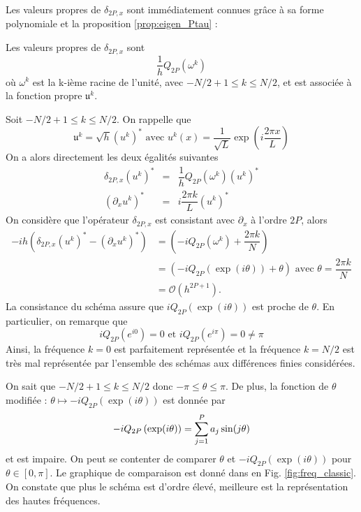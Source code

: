 Les valeurs propres de $\delta_{2P,x}$ sont immédiatement connues grâce à sa forme polynomiale et la proposition \ref{prop:eigen_Ptau} :
\begin{proposition}
Les valeurs propres de $\delta_{2P,x}$ sont
\begin{equation}
\dfrac{1}{h}Q_{2P}(\omega^k)
\end{equation}
où $\omega^k$ est la k-ième racine de l'unité, avec $-N/2+1 \leq k \leq N/2$, et est associée à la fonction propre $\mathfrak{u}^k$.
\end{proposition}

Soit $-N/2+1 \leq k \leq N/2$. On rappelle que
\begin{equation}
\mathfrak{u}^k = \sqrt{h}(u^k)^* \text{ avec } u^k(x)=\dfrac{1}{\sqrt{L}} \exp \left( i \dfrac{2 \pi x}{L} \right)
\end{equation}
On a alors directement les deux égalités suivantes 
\begin{equation*}
\begin{array}{rcl}
\delta_{2P,x} (u^k)^* & = & \dfrac{1}{h}Q_{2P} (\omega^k) (u^k)^*\\
(\partial_x u^k)^* & = & i \dfrac{2 \pi k}{L} (u^k)^*
\end{array}
\end{equation*}
On considère que l'opérateur $\delta_{2P,x}$ est consistant avec $\partial_x$ à l'ordre $2P$, alors
\begin{align*}
-ih \left( \delta_{2P,x} (u^k)^* - (\partial_x u^k)^* \right) & = \left( -i Q_{2P}(\omega^k) + \dfrac{2 \pi k}{N} \right) \\
	& = \left( -i Q_{2P}\left( \exp(i \theta) \right) + \theta \right) \text{ avec } \theta = \dfrac{2 \pi k}{N}\\
	& = \mathcal{O} \left( h^{2P+1} \right).
\end{align*}
La consistance du schéma assure que $i Q_{2P}\left( \exp(i \theta) \right)$ est proche de $\theta$. En particulier, on remarque que
\begin{equation}
 i Q_{2P}(e^{i0}) = 0 \text{ et }  i Q_{2P}(e^{i \pi}) = 0 \neq \pi
\end{equation}
Ainsi, la fréquence $k=0$ est parfaitement représentée et la fréquence $k = N/2$ est très mal représentée par l'ensemble des schémas aux différences finies considérées.

On sait que $-N/2+1 \leq k \leq N/2$ donc $-\pi \leq \theta \leq \pi$. De plus, la fonction de $\theta$ modifiée : $\theta \mapsto -i Q_{2P}\left( \exp(i \theta) \right)$  est donnée par
\begin{equation}
-i Q_{2P}\left( \exp(i \theta) \right) = \displaystyle\sum\limits_{j=1}^P a_j \sin(j \theta)
\end{equation}
et est impaire. On peut se contenter de comparer $\theta$ et $-i Q_{2P}\left( \exp(i \theta) \right)$ pour $\theta \in [0 , \pi]$. Le graphique de comparaison est donné dans en Fig. \ref{fig:freq_classic}. On constate que plus le schéma est d'ordre élevé, meilleure est la représentation des hautes fréquences.


